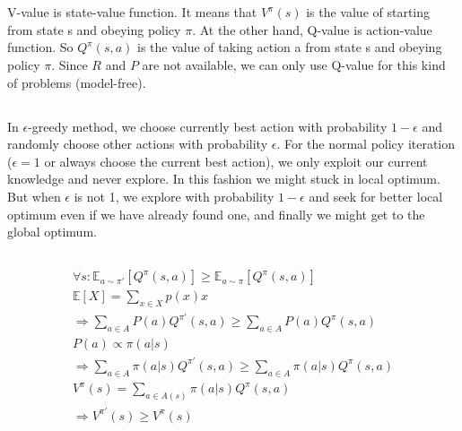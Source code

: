 \documentclass[en]{university}
\begin{document}
\setupdocument

\section{}

\subsection{}

V-value is state-value function. It means that $V^\pi(s)$ is the value of starting from state s and obeying policy $\pi$.
At the other hand, Q-value is action-value function. So $Q^\pi(s, a)$ is the value of taking action a from state s and obeying policy $\pi$.
Since $R$ and $P$ are not available, we can only use Q-value for this kind of problems (model-free).

\subsection{}

In $\epsilon$-greedy method, we choose currently best action with 
probability $1-\epsilon$ and randomly choose other actions with probability $\epsilon$.
For the normal policy iteration ($\epsilon = 1$ or always choose the current best action), 
we only exploit our current knowledge and never explore. In this fashion we might stuck in local optimum.
But when $\epsilon$ is not 1, we explore with probability $1 - \epsilon$ and seek for better local optimum even if we have already found one,
and finally we might get to the global optimum.

\subsection{}

\begin{gather*}
    \forall s : \mathbb{E}_{a \sim \pi'} [Q^\pi(s, a)] \geq \mathbb{E}_{a \sim \pi} [Q^\pi(s, a)] \\
    \mathbb{E}[X] = \sum_{x \in X} p(x) x \\
    \Rightarrow \sum_{a \in A} P(a) Q^{\pi'}(s, a) \geq \sum_{a \in A} P(a) Q^{\pi}(s, a) \\
    P(a) \propto \pi(a|s) \\
    \Rightarrow \sum_{a \in A} \pi(a|s) Q^{\pi'}(s, a) \geq \sum_{a \in A} \pi(a|s) Q^{\pi}(s, a) \\
    V^\pi(s) = \sum_{a \in A(s)} \pi(a|s) Q^\pi(s, a) \\
    \Rightarrow V^{\pi'}(s) \geq V^{\pi}(s)
\end{gather*}
\end{document}

